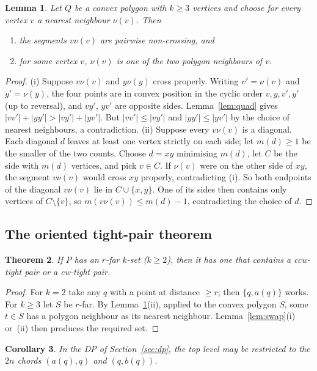 \documentclass[11pt,a4paper]{article}
\newtheorem{theorem}{Theorem}
\newtheorem{lemma}[theorem]{Lemma}
\newtheorem{corollary}[theorem]{Corollary}
\theoremstyle{definition}
\begin{document}
\begin{lemma}\label{lem:nn}
Let $Q$ be a convex polygon with $k\ge3$ vertices and choose for every vertex
$v$ a nearest neighbour $\nu(v)$. Then
\begin{enumerate}[label=(\roman*)]
\item the segments $v\nu(v)$ are pairwise non-crossing, and
\item for some vertex $v$, $\nu(v)$ is one of the two polygon neighbours of $v$.
\end{enumerate}
\end{lemma}
\begin{proof}
(i) Suppose $v\nu(v)$ and $y\nu(y)$ cross properly. Writing $v'=\nu(v)$ and
$y'=\nu(y)$, the four points are in convex position in the cyclic order
$v,y,v',y'$ (up to reversal), and $vy'$, $yv'$ are opposite sides.
Lemma~\ref{lem:quad} gives $|vv'|+|yy'|>|vy'|+|yv'|$. But $|vv'|\le|vy'|$ and
$|yy'|\le|yv'|$ by the choice of nearest neighbours, a contradiction.
(ii) Suppose every $v\nu(v)$ is a diagonal. Each diagonal $d$ leaves at least
one vertex strictly on each side; let $m(d)\ge1$ be the smaller of the two
counts. Choose $d=xy$ minimising $m(d)$, let $C$ be the side with $m(d)$
vertices, and pick $v\in C$. If $\nu(v)$ were on the other side of $xy$, the
segment $v\nu(v)$ would cross $xy$ properly, contradicting (i). So both
endpoints of the diagonal $v\nu(v)$ lie in $C\cup\{x,y\}$. One of its sides
then contains only vertices of $C\setminus\{v\}$, so
$m(v\nu(v))\le m(d)-1$, contradicting the choice of $d$.
\end{proof}

\subsection{The oriented tight-pair theorem}

\begin{theorem}\label{thm:oriented}
If $P$ has an $r$-far $k$-set ($k\ge2$), then it has one that contains a
ccw-tight pair or a cw-tight pair.
\end{theorem}
\begin{proof}
For $k=2$ take any $q$ with a point at distance $\ge r$; then $\{q,a(q)\}$
works. For $k\ge3$ let $S$ be $r$-far. By Lemma~\ref{lem:nn}(ii), applied to
the convex polygon $S$, some $t\in S$ has a polygon neighbour as its nearest
neighbour. Lemma~\ref{lem:swap}(i) or~(ii) then produces the required set.
\end{proof}

\begin{corollary}\label{cor:top}
In the DP of Section~\ref{sec:dp}, the top level may be restricted to the
$2n$ chords $(a(q),q)$ and $(q,b(q))$.
\end{corollary}
\end{document}
